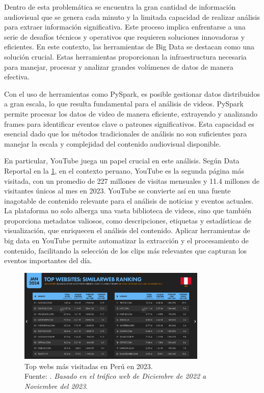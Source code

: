 Dentro de esta problemática se encuentra la gran cantidad de información audiovisual que se genera cada minuto y la limitada capacidad de realizar análisis para extraer información significativa. 
Este proceso implica enfrentarse a una serie de desafíos técnicos y operativos que requieren soluciones innovadoras y eficientes. En este contexto, las herramientas de Big Data se destacan como una solución crucial. Estas herramientas proporcionan la infraestructura necesaria para manejar, procesar y analizar grandes volúmenes de datos de manera efectiva.

Con el uso de herramientas como PySpark, es posible gestionar datos distribuidos a gran escala, lo que resulta fundamental para el análisis de videos. PySpark permite procesar los datos de video de manera eficiente, extrayendo y analizando frames para identificar eventos clave o patrones significativos. Esta capacidad es esencial dado que los métodos tradicionales de análisis no son suficientes para manejar la escala y complejidad del contenido audiovisual disponible.

En particular, YouTube juega un papel crucial en este análisis. Según Data Reportal en la \ref{2:fig}, en el contexto peruano, YouTube es la segunda página más visitada, con un promedio de 227 millones de visitas mensuales y 11.4 millones de visitantes únicos al mes en 2023. 
YouTube se convierte así en una fuente inagotable de contenido relevante para el análisis de noticias y eventos actuales. La plataforma no solo alberga una vasta biblioteca de videos, sino que también proporciona metadatos valiosos, como descripciones, etiquetas y estadísticas de visualización, que enriquecen el análisis del contenido. 
Aplicar herramientas de big data en YouTube permite automatizar la extracción y el procesamiento de contenido, facilitando la selección de los clips más relevantes que capturan los eventos importantes del día.

\begin{figure}[h]
    \begin{center}
        \includegraphics[width=0.80\textwidth]{1/figures/Top_Peru_2023.png}
        \caption[Top webs más visitadas en Perú en 2023]{Top webs más visitadas en Perú en 2023. \\ Fuente: \cite{youtube_peru}. \textit{Basado en el tráfico web de Diciembre de 2022 a Noviembre del 2023}.}
        \label{2:fig}
    \end{center}
\end{figure}

